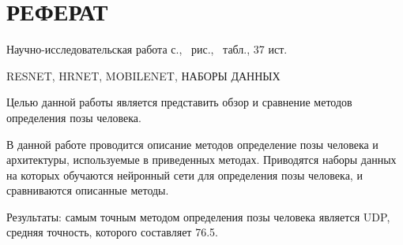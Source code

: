 \section*{РЕФЕРАТ}

Научно-исследовательская работа \pageref{LastPage} с., \totalfigures\ рис., \totaltables\ табл., 37 ист.

RESNET, HRNET, MOBILENET, НАБОРЫ ДАННЫХ

Целью данной работы является представить обзор и сравнение методов определения позы человека.

В данной работе проводится описание методов определение позы человека и архитектуры, используемые в приведенных методах. Приводятся наборы данных на которых обучаются нейронный сети для определения позы человека, и сравниваются описанные методы.

Результаты: самым точным методом определения позы человека является UDP, средняя точность, которого составляет 76.5.


\pagebreak